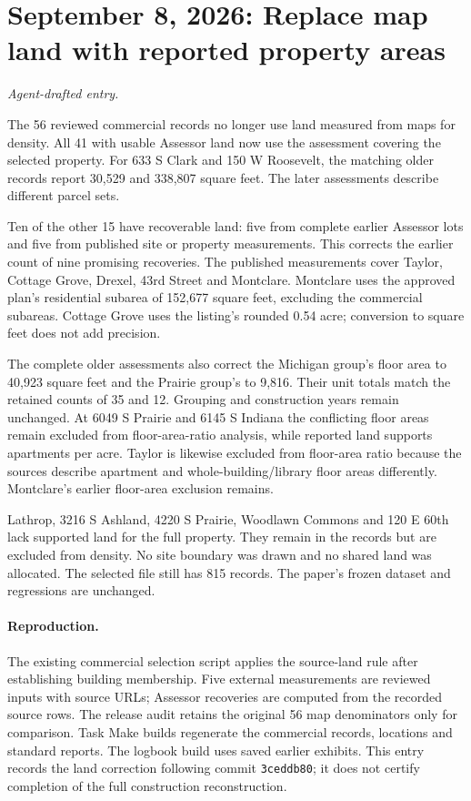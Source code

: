 \clearpage
\section*{September 8, 2026: Replace map land with reported property areas}
\textit{Agent-drafted entry.}

The 56 reviewed commercial records no longer use land measured from maps for density. All 41 with usable Assessor land now use the assessment covering the selected property. For 633 S Clark and 150 W Roosevelt, the matching older records report 30,529 and 338,807 square feet. The later assessments describe different parcel sets.

Ten of the other 15 have recoverable land: five from complete earlier Assessor lots and five from published site or property measurements. This corrects the earlier count of nine promising recoveries. The published measurements cover Taylor, Cottage Grove, Drexel, 43rd Street and Montclare. Montclare uses the approved plan's residential subarea of 152,677 square feet, excluding the commercial subareas. Cottage Grove uses the listing's rounded 0.54 acre; conversion to square feet does not add precision.

The complete older assessments also correct the Michigan group's floor area to 40,923 square feet and the Prairie group's to 9,816. Their unit totals match the retained counts of 35 and 12. Grouping and construction years remain unchanged. At 6049 S Prairie and 6145 S Indiana the conflicting floor areas remain excluded from floor-area-ratio analysis, while reported land supports apartments per acre. Taylor is likewise excluded from floor-area ratio because the sources describe apartment and whole-building/library floor areas differently. Montclare's earlier floor-area exclusion remains.

Lathrop, 3216 S Ashland, 4220 S Prairie, Woodlawn Commons and 120 E 60th lack supported land for the full property. They remain in the records but are excluded from density. No site boundary was drawn and no shared land was allocated. The selected file still has 815 records. The paper's frozen dataset and regressions are unchanged.

\paragraph{Reproduction.} The existing commercial selection script applies the source-land rule after establishing building membership. Five external measurements are reviewed inputs with source URLs; Assessor recoveries are computed from the recorded source rows. The release audit retains the original 56 map denominators only for comparison. Task Make builds regenerate the commercial records, locations and standard reports. The logbook build uses saved earlier exhibits. This entry records the land correction following commit \texttt{3ceddb80}; it does not certify completion of the full construction reconstruction.
